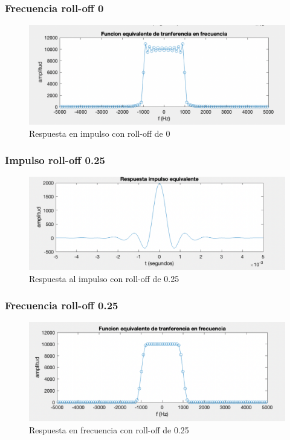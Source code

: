 \subsubsection{Frecuencia roll-off 0} \phantom{text}

\begin{figure}[H]
    \centering
    \includegraphics[scale=0.45]{Imagenes/act 2/impuslorollof0.pdf}
    \caption{Respuesta en impulso con roll-off de 0}
    \label{fig:Respuesta al impulso con roll-off de 0}
\end{figure}



\subsubsection{Impulso roll-off 0.25} \phantom{text}

\begin{figure}[H]
    \centering
    \includegraphics[scale=0.4]{Imagenes/act 2/rolloff0.25imp.pdf}
    \caption{Respuesta al impulso con roll-off de 0.25}
    \label{fig:Respuesta al impulso con roll-off de 0.25}
\end{figure}


\subsubsection{Frecuencia roll-off 0.25} \phantom{text}

\begin{figure}[H]
    \centering
    \includegraphics[scale=0.4]{Imagenes/act 2/rolloff0.25frec.pdf}
    \caption{Respuesta en  frecuencia  con roll-off de 0.25}
    \label{fig:Respuesta en  frecuencia  con roll-off de 0.25}
\end{figure}


